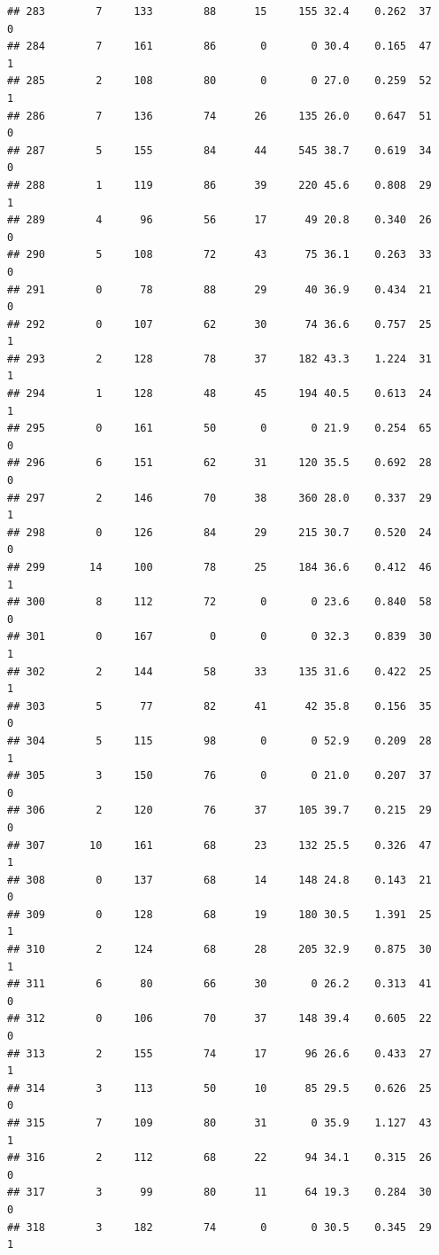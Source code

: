 \documentclass[11pt, a4paper]{article}\usepackage[]{graphicx}\usepackage[]{xcolor}
\makeatletter
\newenvironment{kframe}{%
 \def\at@end@of@kframe{}%
 \ifinner\ifhmode%
  \def\at@end@of@kframe{\end{minipage}}%
  \begin{minipage}{\columnwidth}%
 \fi\fi%
 \def\FrameCommand##1{\hskip\@totalleftmargin \hskip-\fboxsep
 \colorbox{shadecolor}{##1}\hskip-\fboxsep
     \hskip-\linewidth \hskip-\@totalleftmargin \hskip\columnwidth}%
 \MakeFramed {\advance\hsize-\width
   \@totalleftmargin\z@ \linewidth\hsize
   \@setminipage}}%
 {\par\unskip\endMakeFramed%
 \at@end@of@kframe}
\newenvironment{knitrout}{}{} %
\makeatother
\begin{document}
\begin{knitrout}
\begin{kframe}
\begin{verbatim}
## 283        7     133        88      15     155 32.4    0.262  37    0
## 284        7     161        86       0       0 30.4    0.165  47    1
## 285        2     108        80       0       0 27.0    0.259  52    1
## 286        7     136        74      26     135 26.0    0.647  51    0
## 287        5     155        84      44     545 38.7    0.619  34    0
## 288        1     119        86      39     220 45.6    0.808  29    1
## 289        4      96        56      17      49 20.8    0.340  26    0
## 290        5     108        72      43      75 36.1    0.263  33    0
## 291        0      78        88      29      40 36.9    0.434  21    0
## 292        0     107        62      30      74 36.6    0.757  25    1
## 293        2     128        78      37     182 43.3    1.224  31    1
## 294        1     128        48      45     194 40.5    0.613  24    1
## 295        0     161        50       0       0 21.9    0.254  65    0
## 296        6     151        62      31     120 35.5    0.692  28    0
## 297        2     146        70      38     360 28.0    0.337  29    1
## 298        0     126        84      29     215 30.7    0.520  24    0
## 299       14     100        78      25     184 36.6    0.412  46    1
## 300        8     112        72       0       0 23.6    0.840  58    0
## 301        0     167         0       0       0 32.3    0.839  30    1
## 302        2     144        58      33     135 31.6    0.422  25    1
## 303        5      77        82      41      42 35.8    0.156  35    0
## 304        5     115        98       0       0 52.9    0.209  28    1
## 305        3     150        76       0       0 21.0    0.207  37    0
## 306        2     120        76      37     105 39.7    0.215  29    0
## 307       10     161        68      23     132 25.5    0.326  47    1
## 308        0     137        68      14     148 24.8    0.143  21    0
## 309        0     128        68      19     180 30.5    1.391  25    1
## 310        2     124        68      28     205 32.9    0.875  30    1
## 311        6      80        66      30       0 26.2    0.313  41    0
## 312        0     106        70      37     148 39.4    0.605  22    0
## 313        2     155        74      17      96 26.6    0.433  27    1
## 314        3     113        50      10      85 29.5    0.626  25    0
## 315        7     109        80      31       0 35.9    1.127  43    1
## 316        2     112        68      22      94 34.1    0.315  26    0
## 317        3      99        80      11      64 19.3    0.284  30    0
## 318        3     182        74       0       0 30.5    0.345  29    1

\end{verbatim}
\end{kframe}
\end{knitrout}
\end{document}
